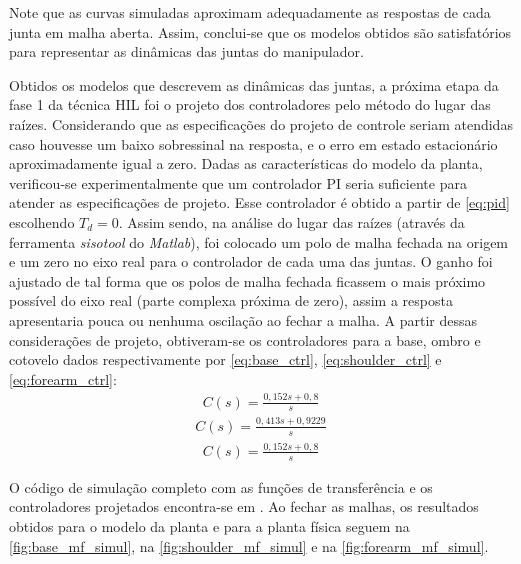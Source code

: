 Note que as curvas simuladas aproximam adequadamente as respostas de cada junta em malha aberta. Assim, 
conclui-se que os modelos obtidos são satisfatórios para representar as dinâmicas das juntas do manipulador.

Obtidos os modelos que descrevem as dinâmicas das juntas, a próxima etapa da fase 1 da técnica HIL foi o projeto dos 
controladores pelo método do lugar das raízes. Considerando que as especificações do projeto
de controle seriam atendidas caso houvesse um baixo sobressinal na resposta, e o erro em estado
estacionário aproximadamente igual a
zero. Dadas as características do modelo da planta, verificou-se experimentalmente que um controlador
PI seria suficiente para atender as especificações de projeto. Esse controlador é obtido a partir
de \eqref{eq:pid} escolhendo $T_d=0$.
Assim sendo, na análise do lugar das raízes (através da ferramenta \textit{sisotool} do \textit{Matlab}), foi colocado um polo de malha
fechada na origem e um zero no eixo real para o controlador de cada uma das juntas. O ganho foi 
ajustado de tal forma que os polos de malha fechada ficassem o mais próximo possível do eixo real (parte complexa próxima de zero), 
assim a resposta apresentaria pouca ou nenhuma oscilação ao fechar a malha. A partir dessas considerações de projeto, 
obtiveram-se os controladores para a base, ombro e cotovelo dados respectivamente por \eqref{eq:base_ctrl}, \eqref{eq:shoulder_ctrl}
e \eqref{eq:forearm_ctrl}:
\begin{equation}
  \begin{gathered}
    C(s) = \frac{0,152s + 0,8}{s}
  \end{gathered}
  \label{eq:base_ctrl}
\end{equation}
\begin{equation}
  \begin{gathered}
    C(s) = \frac{0,413 s + 0,9229}{s}
  \end{gathered}
  \label{eq:shoulder_ctrl}
\end{equation}
\begin{equation}
  \begin{gathered}
   C(s) = \frac{0,152s + 0,8}{s}
  \end{gathered}
  \label{eq:forearm_ctrl}
\end{equation}

O código de simulação completo com as funções de transferência e os controladores projetados encontra-se em \cite{lelis_hil1}.
Ao fechar as malhas, os resultados obtidos para o modelo da planta e para a planta física seguem na 
\autoref{fig:base_mf_simul}, na \autoref{fig:shoulder_mf_simul} e na \autoref{fig:forearm_mf_simul}.

